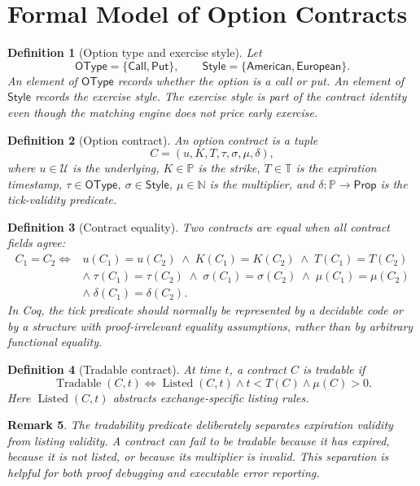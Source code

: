 \documentclass[11pt]{article}
\newtheorem{definition}{Definition}[section]
\newtheorem{remark}[definition]{Remark}
\newcommand{\Call}{\mathsf{Call}}
\newcommand{\Put}{\mathsf{Put}}
\newcommand{\Amer}{\mathsf{American}}
\newcommand{\Euro}{\mathsf{European}}
\newcommand{\Price}{\mathbb P}
\newcommand{\Time}{\mathbb T}
\newcommand{\tradable}{\operatorname{Tradable}}
\newcommand{\listed}{\operatorname{Listed}}
\begin{document}
\section{Formal Model of Option Contracts}

\begin{definition}[Option type and exercise style]
Let
\[
\mathsf{OType}=\{\Call,\Put\},
\qquad
\mathsf{Style}=\{\Amer,\Euro\}.
\]
An element of \(\mathsf{OType}\) records whether the option is a call or put. An element of \(\mathsf{Style}\) records the exercise style. The exercise style is part of the contract identity even though the matching engine does not price early exercise.
\end{definition}

\begin{definition}[Option contract]
An option contract is a tuple
\[
C=(u,K,T,\tau,\sigma,\mu,\delta),
\]
where \(u\in\mathcal U\) is the underlying, \(K\in\Price\) is the strike, \(T\in\Time\) is the expiration timestamp, \(\tau\in\mathsf{OType}\), \(\sigma\in\mathsf{Style}\), \(\mu\in\mathbb N\) is the multiplier, and \(\delta:\Price\to\mathsf{Prop}\) is the tick-validity predicate.
\end{definition}

\begin{definition}[Contract equality]
Two contracts are equal when all contract fields agree:
\[
\begin{aligned}
C_1=C_2
\iff{}& u(C_1)=u(C_2)\;\wedge\; K(C_1)=K(C_2)\;\wedge\; T(C_1)=T(C_2)\\
&\wedge\; \tau(C_1)=\tau(C_2)\;\wedge\; \sigma(C_1)=\sigma(C_2)\;\wedge\; \mu(C_1)=\mu(C_2)\\
&\wedge\; \delta(C_1)=\delta(C_2).
\end{aligned}
\]
In Coq, the tick predicate should normally be represented by a decidable code or by a structure with proof-irrelevant equality assumptions, rather than by arbitrary functional equality.
\end{definition}

\begin{definition}[Tradable contract]
At time \(t\), a contract \(C\) is tradable if
\[
\tradable(C,t)
\iff
\listed(C,t)\wedge t<T(C)\wedge \mu(C)>0.
\]
Here \(\listed(C,t)\) abstracts exchange-specific listing rules.
\end{definition}

\begin{remark}
The tradability predicate deliberately separates expiration validity from listing validity. A contract can fail to be tradable because it has expired, because it is not listed, or because its multiplier is invalid. This separation is helpful for both proof debugging and executable error reporting.
\end{remark}
\end{document}
